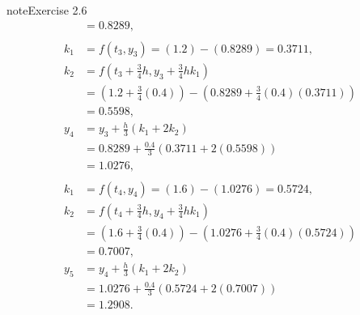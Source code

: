 \documentclass[letterpaper,10pt,english]{jupyterBook}
\begin{document}
\begin{sphinxadmonition}{note}{Exercise 2.6}
\begin{align*}
    &= 0.8289, \\
    \\
    k_1 &= f(t_3, y_3) = (1.2) - (0.8289) = 0.3711, \\
    k_2 &= f(t_3 + \tfrac{3}{4} h, y_3 + \tfrac{3}{4} hk_1) \\
    &= (1.2 + \tfrac{3}{4}(0.4)) - (0.8289 + \tfrac{3}{4}(0.4)(0.3711)) \\
    &= 0.5598, \\
    y_4 &= y_3 + \frac{h}{3}(k_1 + 2 k_2) \\
    &= 0.8289 + \frac{0.4}{3}(0.3711 + 2(0.5598)) \\
    &= 1.0276, \\
    \\
    k_1 &= f(t_4, y_4) = (1.6) - (1.0276) = 0.5724, \\
    k_2 &= f(t_4 + \tfrac{3}{4} h, y_4 + \tfrac{3}{4} hk_1) \\
    &= (1.6 + \tfrac{3}{4}(0.4)) - (1.0276 + \tfrac{3}{4}(0.4)(0.5724)) \\
    &= 0.7007, \\
    y_5 &= y_4 + \frac{h}{3}(k_1 + 2 k_2) \\
    &= 1.0276 + \frac{0.4}{3}(0.5724 + 2(0.7007)) \\
    &= 1.2908.
\end{align*}\end{sphinxadmonition}
\end{document}
